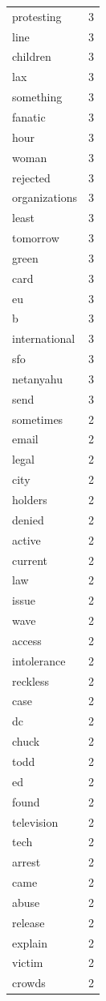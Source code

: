 \begin{tabular}{lr}
protesting & 3 \\
line & 3 \\
children & 3 \\
lax & 3 \\
something & 3 \\
fanatic & 3 \\
hour & 3 \\
woman & 3 \\
rejected & 3 \\
organizations & 3 \\
least & 3 \\
tomorrow & 3 \\
green & 3 \\
card & 3 \\
eu & 3 \\
b & 3 \\
international & 3 \\
sfo & 3 \\
netanyahu & 3 \\
send & 3 \\
sometimes & 2 \\
email & 2 \\
legal & 2 \\
city & 2 \\
holders & 2 \\
denied & 2 \\
active & 2 \\
current & 2 \\
law & 2 \\
issue & 2 \\
wave & 2 \\
access & 2 \\
intolerance & 2 \\
reckless & 2 \\
case & 2 \\
dc & 2 \\
chuck & 2 \\
todd & 2 \\
ed & 2 \\
found & 2 \\
television & 2 \\
tech & 2 \\
arrest & 2 \\
came & 2 \\
abuse & 2 \\
release & 2 \\
explain & 2 \\
victim & 2 \\
crowds & 2 \\

\end{tabular}
